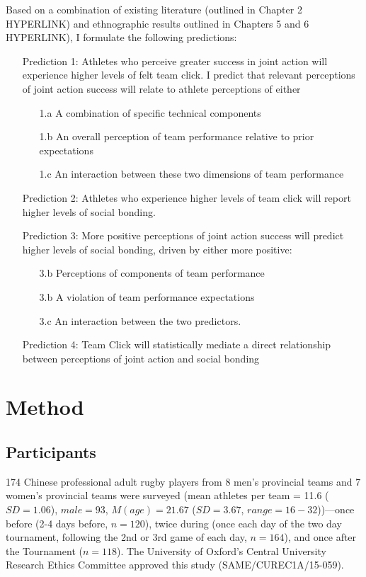 \begin{CJK}{UTF8}{gbsn}
Based on a combination of existing literature (outlined in Chapter 2 HYPERLINK) and ethnographic results outlined in Chapters 5 and 6 HYPERLINK), I formulate the following predictions:

\begin{itemize}
  \item[Prediction 1:] Athletes who perceive greater success in joint action will experience higher levels of felt team click. I predict that relevant perceptions of joint action success will relate to athlete perceptions of either
      \begin{itemize}
        \item[1.a] A combination of specific technical components
        \item[1.b] An overall perception of team performance relative to prior expectations
        \item[1.c] An interaction between these two dimensions of team performance
      \end{itemize}
  \item[Prediction 2:] Athletes who experience higher levels of team click will report higher levels of social bonding.
  \item[Prediction 3:] More positive perceptions of joint action success will predict higher levels of social bonding, driven by either more positive:
    \begin{itemize}
        \item[3.b] Perceptions of components of team performance
    	  \item[3.b] A violation of team performance expectations
        \item[3.c] An interaction between the two predictors.
    \end{itemize}
  \item[Prediction 4:] Team Click will statistically mediate a direct relationship between perceptions of joint action and social bonding
\end{itemize}



\clearpage

\section{Method}
\subsection{Participants}
174 Chinese professional adult rugby players from 8 men’s provincial teams and 7 women’s provincial teams were surveyed  (mean athletes per team = 11.6 ($SD =1.06$), $male = 93$, $M(age) = 21.67$ ($SD = 3.67$, $range = 16 - 32$))---once before (2-4 days before, $n = 120$), twice during (once each day of the two day tournament, following the 2nd or 3rd game of each day, $n = 164$), and once after the Tournament ($n = 118$).  The University of Oxford’s Central University Research Ethics Committee approved this study (SAME/CUREC1A/15-059).


\end{CJK}
